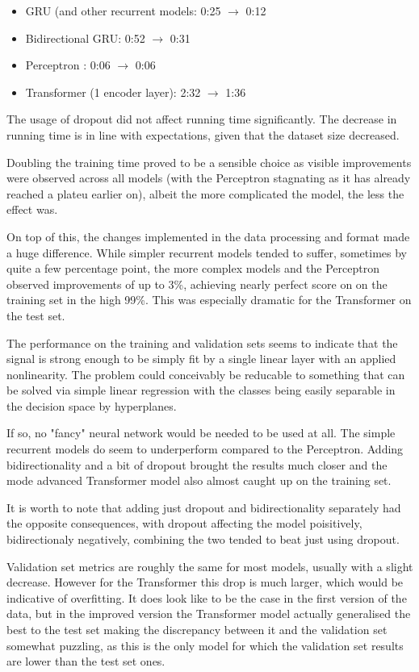\documentclass[bsc,frontabs,singlespacing,parskip,deptreport]{infthesis}
\begin{document}
\begin{itemize}

\item GRU (and other recurrent models: 0:25 $ \rightarrow $ 0:12
\item Bidirectional GRU: 0:52 $ \rightarrow $ 0:31
\item Perceptron : 0:06 $ \rightarrow $ 0:06
\item Transformer (1 encoder layer): 2:32 $ \rightarrow $ 1:36

\end{itemize}

The usage of dropout did not affect running time significantly. The decrease in running time is in line with expectations, given that the dataset size decreased.

Doubling the training time proved to be a sensible choice as visible improvements were observed across all models (with the Perceptron stagnating as it has already reached a plateu earlier on), albeit the more complicated the model, the less the effect was.

On top of this, the changes implemented in the data processing and format made a huge difference. While simpler recurrent models tended to suffer, sometimes by quite a few percentage point, the more complex models and the Perceptron observed improvements of up to 3\%, achieving nearly perfect score on on the training set in the high 99\%. This was especially dramatic for the Transformer on the test set.

The performance on the training and validation sets seems to indicate that the signal is strong enough to be simply fit by a single linear layer with an applied nonlinearity. The problem could conceivably be reducable to something that can be solved via simple linear regression with the classes being easily separable in the decision space by hyperplanes.

If so, no "fancy" neural network would be needed to be used at all. The simple recurrent models do seem to underperform compared to the Perceptron. Adding bidirectionality and a bit of dropout brought the results much closer and the mode advanced Transformer model also almost caught up on the training set.

It is worth to note that adding just dropout and bidirectionality separately had the opposite consequences, with dropout affecting the model poisitively, bidirectionaly negatively, combining the two tended to beat just using dropout.

Validation set metrics are roughly the same for most models, usually with a slight decrease. However for the Transformer this drop is much larger, which would be indicative of overfitting. It does look like to be the case in the first version of the data, but in the improved version the Transformer model actually generalised the best to the test set making the discrepancy between it and the validation set somewhat puzzling, as this is the only model for which the validation set results are lower than the test set ones.
\end{document}
